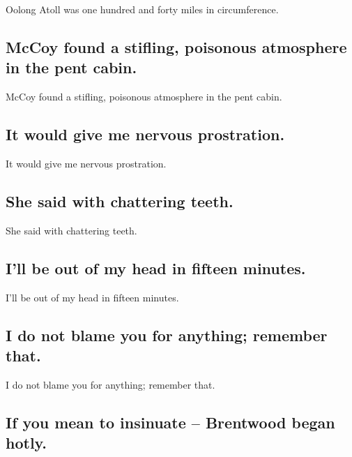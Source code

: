 \documentclass[]{article}
\begin{document}
Oolong Atoll was one hundred and forty miles in circumference.

\hypertarget{mccoy-found-a-stifling-poisonous-atmosphere-in-the-pent-cabin.}{%
\subsection{McCoy found a stifling, poisonous atmosphere in the pent
cabin.}\label{mccoy-found-a-stifling-poisonous-atmosphere-in-the-pent-cabin.}}

McCoy found a stifling, poisonous atmosphere in the pent cabin.

\hypertarget{it-would-give-me-nervous-prostration.}{%
\subsection{It would give me nervous
prostration.}\label{it-would-give-me-nervous-prostration.}}

It would give me nervous prostration.

\hypertarget{she-said-with-chattering-teeth.}{%
\subsection{She said with chattering
teeth.}\label{she-said-with-chattering-teeth.}}

She said with chattering teeth.

\hypertarget{ill-be-out-of-my-head-in-fifteen-minutes.}{%
\subsection{I'll be out of my head in fifteen
minutes.}\label{ill-be-out-of-my-head-in-fifteen-minutes.}}

I'll be out of my head in fifteen minutes.

\hypertarget{i-do-not-blame-you-for-anything-remember-that.}{%
\subsection{I do not blame you for anything; remember
that.}\label{i-do-not-blame-you-for-anything-remember-that.}}

I do not blame you for anything; remember that.

\hypertarget{if-you-mean-to-insinuate-brentwood-began-hotly.}{%
\subsection{If you mean to insinuate -- Brentwood began
hotly.}\label{if-you-mean-to-insinuate-brentwood-began-hotly.}}
\end{document}
